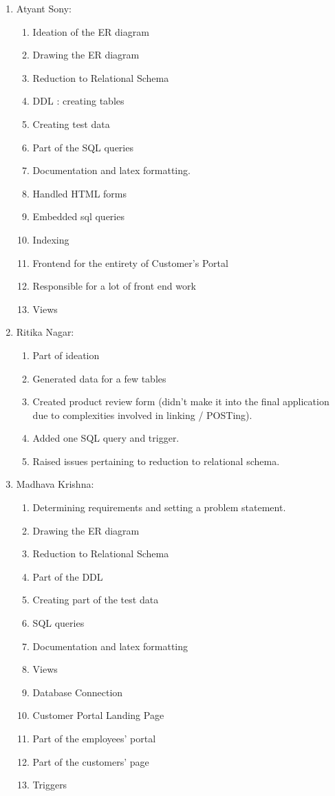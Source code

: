 \documentclass[12pt]{report}
\begin{document}
\begin{enumerate}
		\item Atyant Sony:
			\begin{enumerate}
				\item Ideation of the ER diagram
				\item Drawing the ER diagram
				\item Reduction to Relational Schema
				\item DDL : creating tables
				\item Creating test data
				\item Part of the SQL queries
				\item Documentation and latex formatting.
				\item Handled HTML forms
                \item Embedded sql queries
                \item Indexing
                \item Frontend for the entirety of Customer's Portal
                \item Responsible for a lot of front end work
                \item Views
			\end{enumerate}
		\item Ritika Nagar:			
            \begin{enumerate}
                \item Part of ideation
                \item Generated data for a few tables
                \item Created product review form (didn't make it into the final application due to complexities involved in linking / POSTing).
                \item Added one SQL query and trigger.
                \item Raised issues pertaining to reduction to relational schema.
            \end{enumerate}
		\item Madhava Krishna:
			\begin{enumerate}
				\item Determining requirements and setting a problem statement.
				\item Drawing the ER diagram
				\item Reduction to Relational Schema
				\item Part of the DDL
				\item Creating part of the test data
				\item SQL queries
				\item Documentation and latex formatting
				\item Views
				\item Database Connection
				\item Customer Portal Landing Page
				\item Part of the employees' portal
				\item Part of the customers' page
                \item Triggers
			\end{enumerate}
	\end{enumerate}
\end{document}
